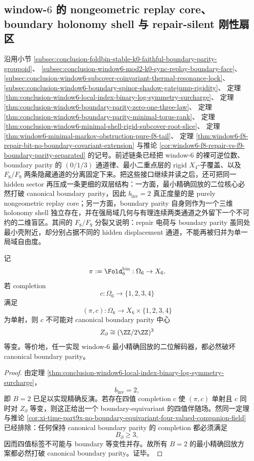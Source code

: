 \subsection{window-\texorpdfstring{$6$}{6} 的 nongeometric replay core、boundary holonomy shell 与 repair-silent 刚性扇区}\label{subsec:conclusion-window6-replaycore-holonomy-boundary-blindspot}

沿用小节 \ref{subsec:conclusion-foldbin-stable-k0-faithful-boundary-parity-groupoid}、
\ref{subsec:conclusion-window6-mod2-k0-sync-replay-boundary-face}、
\ref{subsec:conclusion-window6-subcover-coinvariant-thermal-resonance-lock}、
\ref{subsec:conclusion-window6-boundary-spinor-shadow-gatejump-rigidity}、
定理 \ref{thm:conclusion-window6-local-index-binary-log-symmetry-surcharge}、
定理 \ref{thm:conclusion-window6-boundary-parity-zero-one-three-law}、
定理 \ref{thm:conclusion-window6-boundary-parity-minimal-torus-rank}、
定理 \ref{thm:conclusion-window6-minimal-shell-rigid-subcover-root-slice}、
定理 \ref{thm:window6-minimal-markov-obstruction-pure-f8-tail}、
定理 \ref{thm:window6-f8-repair-bit-no-boundary-covariant-extension}
与推论 \ref{cor:window6-f8-repair-vs-f9-boundary-parity-separated} 的记号。前述链条已经把 window-\(6\) 的裸可逆位数、boundary parity 的 \((0/1/3)\) 通道律、最小二重点层的 rigid \(X_4\)-子覆盖、以及 \(F_8/F_9\) 两条隐藏通道的分离固定下来。把这些接口继续并读之后，还可把同一 hidden sector 再压成一条更细的双层结构：一方面，最小精确回放的二位核心必然打破 canonical boundary parity，因此 \(b_{\mathrm{inv}}=2\) 真正度量的是 purely nongeometric replay core；另一方面，boundary parity 自身则作为一个三维 holonomy shell 独立存在，并在强局域几何与有理连续两类通道之外留下一个不可约的二维盲区。其间的 \(F_8/F_9\) 分裂又说明：repair 电荷与 boundary parity 虽同处最小壳附近，却分别占据不同的 hidden displacement 通道，不能再被归并为单一局域自由度。

\begin{theorem}[最小精确回放的对称破缺]\label{thm:conclusion-window6-minimal-exact-replay-symmetry-breaking}
记
\[
\pi:=\Fold_6^{\mathrm{bin}}:\Omega_6\to X_6.
\]
若 completion
\[
c:\Omega_6\to \{1,2,3,4\}
\]
满足
\[
(\pi,c):\Omega_6\longrightarrow X_6\times \{1,2,3,4\}
\]
为单射，则 \(c\) 不可能对 canonical boundary parity 中心
\[
Z_{\partial}\cong (\ZZ/2\ZZ)^3
\]
等变。等价地，任一实现 window-\(6\) 最小精确回放的二位解码器，都必然破坏 canonical boundary parity。
\end{theorem}
\begin{proof}
由定理 \ref{thm:conclusion-window6-local-index-binary-log-symmetry-surcharge}，
\[
b_{\mathrm{inv}}=2,
\]
即 \(B=2\) 已足以实现精确反演。若存在四值 completion \(c\) 使 \((\pi,c)\) 单射且 \(c\) 同时对 \(Z_{\partial}\) 等变，则这正给出一个 boundary-equivariant 的四值伴随场。然同一定理与推论 \ref{cor:xi-time-part9x-no-boundary-equivariant-four-valued-companion-field} 已经排除：任何保持 canonical boundary parity 的 completion 都必须满足
\[
B_{\partial}\ge 3,
\]
因而四值标签不可能与 boundary 等变性并存。故所有 \(B=2\) 的最小精确回放方案都必然打破 canonical boundary parity。证毕。
\end{proof}

